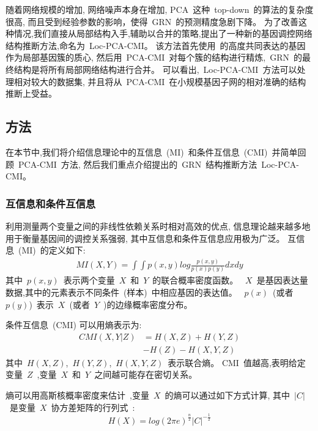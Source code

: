 随着网络规模的增加, 网络噪声本身在增加,
PCA~这种~top-down~的算法的复杂度很高, 而且受到经验参数的影响，使得~GRN~的预测精度急剧下降。
为了改善这种情况,我们直接从局部结构入手,辅助以合并的策略,提出了一种新的基因调控网络结构推断方法,命名为~Loc-PCA-CMI。
该方法首先使用~的高度共同表达的基因作为局部基因簇的质心,
然后用~PCA-CMI~对每个簇的结构进行精炼,~GRN~的最终结构是将所有局部网络结构进行合并。
可以看出,~Loc-PCA-CMI~方法可以处理相对较大的数据集,
并且将从~PCA-CMI~在小规模基因子网的相对准确的结构推断上受益。

\subsection{方法}
在本节中,我们将介绍信息理论中的互信息~(MI)~和条件互信息~(CMI)~并简单回顾~PCA-CMI~方法,
然后我们重点介绍提出的~GRN~结构推断方法~Loc-PCA-CMI。

\subsubsection{互信息和条件互信息}
\label{relatedwork}
利用测量两个变量之间的非线性依赖关系时相对高效的优点,
信息理论越来越多地用于衡量基因间的调控关系强弱, 其中互信息和条件互信息应用极为广泛。
互信息~(MI)~的定义如下:
\begin{align} %
    MI(X,Y)=\int \int p(x,y)log \frac{p(x,y)}{p(x)p(y)}dxdy
 \end{align}
 其中~$p(x,y)$~表示两个变量~$X$~和~$Y$~的联合概率密度函数。
~$X$~是基因表达量数据,其中的元素表示不同条件~(样本)~中相应基因的表达值。
~$p(x)$~(或者~$p(y)$)~表示~$X$~(或者~$Y$~)的边缘概率密度分布。

条件互信息~(CMI) 可以用熵表示为:
\begin{equation}
\begin{split}
CMI(X,Y|Z) &= H(X,Z) + H(Y,Z)\\
               & - H(Z) - H(X,Y,Z)
\end{split}
\end{equation}
其中~$H(X,Z)$,~$H(Y,Z)$,~$H(X,Y,Z)$~表示联合熵。
CMI~值越高,表明给定变量~$Z$~,变量~$X$~和~$Y$~之间越可能存在密切关系。

熵可以用高斯核概率密度来估计~\cite{basso2005reverse},变量~$X$~的熵可以通过如下方式计算, 
其中~$|C|$~是变量~$X$~协方差矩阵的行列式~\cite{zhang2011inferring}:
\begin{equation}
    H(X) = log(2\pi e )^\frac{n}{2} |C| ^ {-\frac{1}{2}}
\end{equation}


